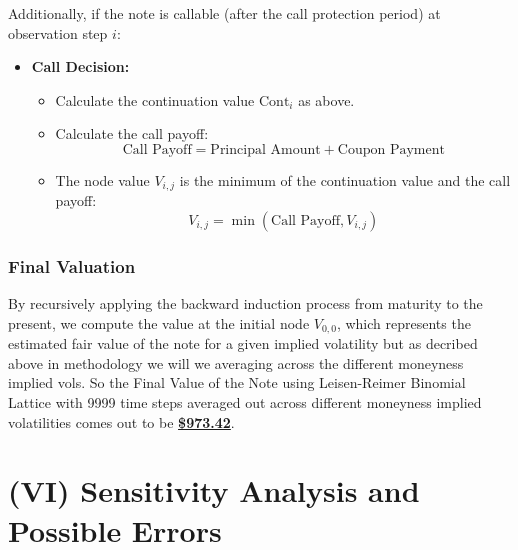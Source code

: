 \documentclass[12pt,a4paper]{article}
\begin{document}
Additionally, if the note is callable (after the call protection period) at observation step \( i \):
\vspace{-2ex}
\begin{itemize}
    \item \textbf{Call Decision:}
    \begin{itemize}
        \item Calculate the continuation value \( \text{Cont}_i \) as above.
        \item Calculate the call payoff:
        \[
        \text{Call Payoff} = \text{Principal Amount} + \text{Coupon Payment}
        \]
        \item The node value \( V_{i,j} \) is the minimum of the continuation value and the call payoff:
        \[
        V_{i,j} = \min\left( \text{Call Payoff}, V_{i,j} \right)
        \]
    \end{itemize}
\end{itemize}
\vspace{-5ex}
\subsubsection*{Final Valuation}

By recursively applying the backward induction process from maturity to the present, we compute the value at the initial node \( V_{0,0} \), which represents the estimated fair value of the note for a given implied volatility but as decribed above in methodology we will we averaging across the different moneyness implied vols. So the Final Value of the Note using Leisen-Reimer Binomial Lattice with 9999 time steps averaged out across different moneyness implied volatilities comes out to be  \underline{\textbf{\$973.42}}.

\vspace{-2ex}

\section*{(VI) Sensitivity Analysis and Possible Errors}
\end{document}
